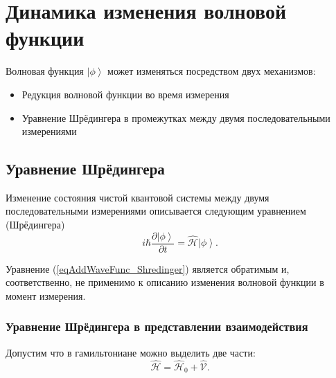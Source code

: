 \section{Динамика изменения волновой функции}
\label{AddWaveFunc}
Волновая функция $\left| \phi \right>$ может изменяться посредством
двух механизмов:
\begin{itemize}
\item Редукция волновой функции во время измерения
\item Уравнение Шрёдингера в промежутках между двумя последовательными
  измерениями 
\end{itemize}

\subsection{Уравнение Шрёдингера}
Изменение состояния чистой квантовой системы между двумя
последовательными измерениями описывается следующим уравнением (Шрёдингера)
\begin{equation}
i \hbar \frac{\partial \left| \phi \right>}{\partial t} = \hat{\mathcal{H}}
\left| \phi \right>.
\label{eqAddWaveFunc_Shredinger}
\end{equation}

Уравнение (\ref{eqAddWaveFunc_Shredinger}) является обратимым и,
соответственно, не применимо к описанию изменения волновой функции в
момент измерения.

\subsubsection{Уравнение Шрёдингера в представлении взаимодействия}
\label{AddWaveFuncInter}
Допустим что в гамильтониане можно выделить две части:
\begin{equation}
\hat{\mathcal{H}} = \hat{\mathcal{H}}_0 + \hat{\mathcal{V}}.
\nonumber
\end{equation}

